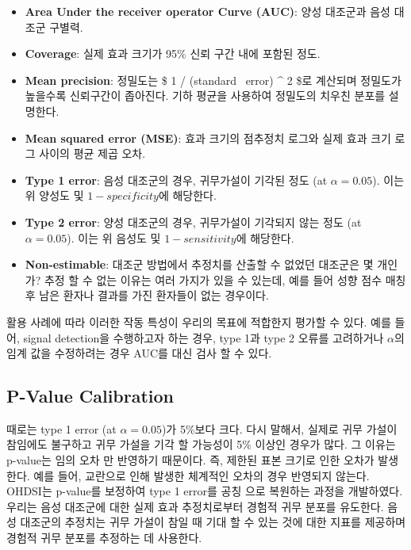 \documentclass[11pt]{book}
\providecommand{\tightlist}{%
  \setlength{\itemsep}{0pt}\setlength{\parskip}{0pt}}
\theoremstyle{definition}
\theoremstyle{definition}
\theoremstyle{definition}
\theoremstyle{remark}
\begin{document}
\begin{itemize}
\tightlist
\item
  \textbf{Area Under the receiver operator Curve (AUC)}: 양성 대조군과
  음성 대조군 구별력.
\item
  \textbf{Coverage}: 실제 효과 크기가 95\% 신뢰 구간 내에 포함된 정도.
\item
  \textbf{Mean precision}: 정밀도는 \$ 1 / (standard ~error) \^{} 2 \$로
  계산되며 정밀도가 높을수록 신뢰구간이 좁아진다. 기하 평균을 사용하여
  정밀도의 치우친 분포를 설명한다.
\item
  \textbf{Mean squared error (MSE)}: 효과 크기의 점추정치 로그와 실제
  효과 크기 로그 사이의 평균 제곱 오차.
\item
  \textbf{Type 1 error}: 음성 대조군의 경우, 귀무가설이 기각된 정도 (at
  \(\alpha = 0.05\)). 이는 위 양성도 및 \(1 - specificity\)에 해당한다.
\item
  \textbf{Type 2 error}: 양성 대조군의 경우, 귀무가설이 기각되지 않는
  정도 (at \(\alpha = 0.05\)). 이는 위 음성도 및 \(1 - sensitivity\)에
  해당한다.
\item
  \textbf{Non-estimable}: 대조군 방법에서 추정치를 산출할 수 없었던
  대조군은 몇 개인가? 추정 할 수 없는 이유는 여러 가지가 있을 수 있는데,
  예를 들어 성향 점수 매칭 후 남은 환자나 결과를 가진 환자들이 없는
  경우이다.
\end{itemize}

활용 사례에 따라 이러한 작동 특성이 우리의 목표에 적합한지 평가할 수
있다. 예를 들어, signal detection을 수행하고자 하는 경우, type 1과 type
2 오류를 고려하거나 \(\alpha\)의 임계 값을 수정하려는 경우 AUC를 대신
검사 할 수 있다.

\subsection{P-Value Calibration}\label{p-value-calibration}

 

때로는 type 1 error (at \(\alpha = 0.05\))가 5\%보다 크다. 다시 말해서,
실제로 귀무 가설이 참임에도 불구하고 귀무 가설을 기각 할 가능성이 5\%
이상인 경우가 많다. 그 이유는 p-value는 임의 오차 만 반영하기 때문이다.
즉, 제한된 표본 크기로 인한 오차가 발생한다. 예를 들어, 교란으로 인해
발생한 체계적인 오차의 경우 반영되지 않는다. OHDSI는 p-value를 보정하여
type 1 error를 공칭 으로 복원하는 과정을 개발하였다.
\citep{schuemie_2014} 우리는 음성 대조군에 대한 실제 효과 추정치로부터
경험적 귀무 분포를 유도한다. 음성 대조군의 추정치는 귀무 가설이 참일 때
기대 할 수 있는 것에 대한 지표를 제공하며 경험적 귀무 분포를 추정하는 데
사용한다.
\end{document}
